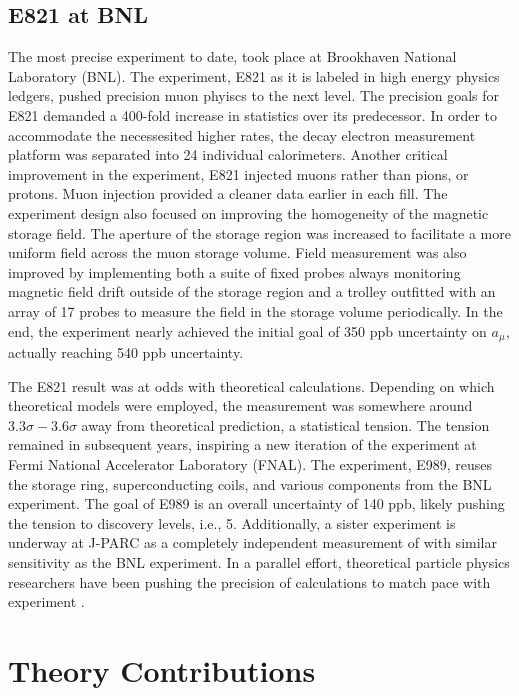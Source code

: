 \subsection{E821 at BNL}
The most precise \mugmtwo experiment to date, took place at Brookhaven National Laboratory (BNL). The experiment, E821 as it is labeled in high energy physics ledgers, pushed precision muon phyiscs to the next level.  The precision goals for E821 demanded a 400-fold increase in statistics over its predecessor.  In order to accommodate the necessesited higher rates, the decay electron measurement platform was separated into 24 individual calorimeters.  Another critical improvement in the experiment, E821 injected muons rather than pions, or protons.  Muon injection provided a cleaner data earlier in each fill.  The experiment design also focused on improving the homogeneity of the magnetic storage field.  The aperture of the storage region was increased to facilitate a more uniform field across the muon storage volume.  Field measurement was also improved by implementing both a suite of fixed probes always monitoring magnetic field drift outside of the storage region and a trolley outfitted with an array of 17 probes to measure the field in the storage volume periodically.  In the end, the experiment nearly achieved the initial goal of 350 ppb uncertainty on $a_\mu$, actually reaching 540 ppb uncertainty\cite{e821-prd}.

The E821 \gmtwo result was at odds with theoretical calculations.  Depending on which theoretical models were employed, the measurement was somewhere around $3.3\sigma - 3.6\sigma$ away from theoretical prediction, a statistical tension.  The tension remained in subsequent years, inspiring a new iteration of the \mugmtwo experiment at Fermi National Accelerator Laboratory (FNAL). The experiment, E989, reuses the storage ring, superconducting coils, and various components from the BNL experiment.  The goal of E989 is an overall uncertainty of 140 ppb, likely pushing the tension to discovery levels, i.e., \SI{5}{\sigma}. Additionally, a sister experiment is underway at J-PARC as a completely independent measurement of \mugmtwo with similar sensitivity as the BNL experiment.  In a parallel effort, theoretical particle physics researchers have been pushing the precision of calculations to match pace with experiment .

\section{Theory Contributions} \label{sec:theory}

